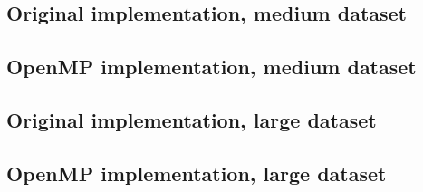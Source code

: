 \documentclass[11pt]{article}
\begin{document}
\subsection{Original implementation, medium dataset}


\subsection{OpenMP implementation, medium dataset}

\subsection{Original implementation, large dataset}


\subsection{OpenMP implementation, large dataset}

\end{document}

